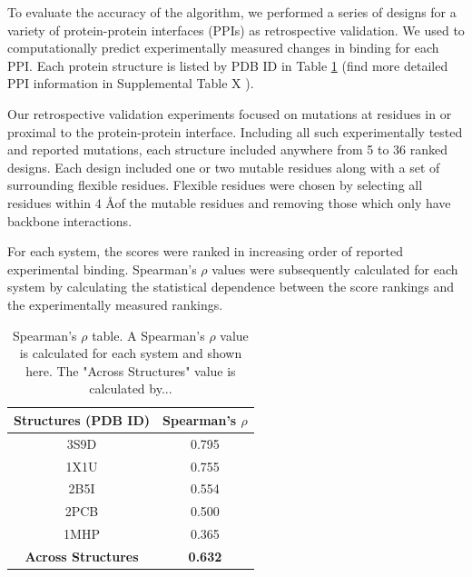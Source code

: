 To evaluate the accuracy of the \osprey \ks algorithm, we performed a series of designs for a variety of protein-protein interfaces (PPIs) as retrospective validation. We used \ks to computationally predict experimentally measured changes in binding for each PPI. Each protein structure is listed by PDB ID in Table \ref{table:spearman} (find more detailed PPI information in Supplemental Table X ).


Our retrospective validation experiments focused on mutations at residues in or proximal to the protein-protein interface. Including all such experimentally tested and reported mutations, each structure included anywhere from 5 to 36 ranked designs. Each design included one or two mutable residues along with a set of surrounding flexible residues. Flexible residues were chosen by selecting all residues within 4 \AA of the mutable residues and removing those which only have backbone interactions. 

For each system, the \ks scores were ranked in increasing order of reported experimental binding. Spearman's $\rho$ values were subsequently calculated for each system by calculating the statistical dependence between the \ks score rankings and the experimentally measured rankings. 

\begin{table}[h!]\label{table:spearman}
\centering
\begin{tabular}{ |c||c|  }
 \hline
 \textbf{Structures (PDB ID)}& \textbf{Spearman's $\rho$} \\
 \hline 
 3S9D   & 0.795 \\
 \hline
 1X1U   & 0.755 \\
 \hline
 2B5I   & 0.554 \\
 \hline
 2PCB   & 0.500 \\
 \hline
 1MHP   & 0.365 \\
 \hline 
 \textbf{Across Structures} &   \textbf{0.632}  \\
 \hline
\end{tabular}
\caption{Spearman's $\rho$ table. A Spearman's $\rho$ value is calculated for each system and shown here. The "Across Structures" value is calculated by... }
\end{table}

